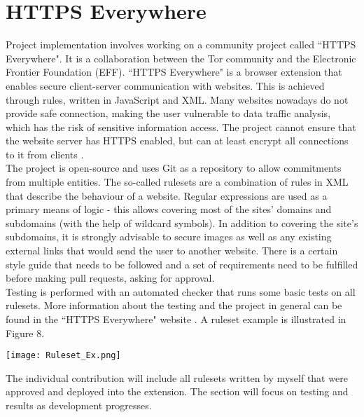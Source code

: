 \documentclass[a4paper, 12pt, titlepage]{article}
\begin{document}
\section{HTTPS Everywhere}
Project implementation involves working on a community project called ``HTTPS Everywhere". It is a collaboration between the Tor community and the Electronic Frontier Foundation (EFF). ``HTTPS Everywhere" is a browser extension that enables secure client-server communication with websites. This is achieved through rules, written in JavaScript and XML. Many websites nowadays do not provide safe connection, making the user vulnerable to data traffic analysis, which has the risk of sensitive information access. The project cannot ensure that the website server has HTTPS enabled, but can at least encrypt all connections to it from clients \cite{HTTPSEW}. \\[6pt]
The project is open-source and uses Git as a repository to allow commitments from multiple entities. The so-called rulesets are a combination of rules in XML that describe the behaviour of a website. Regular expressions are used as a primary means of logic - this allows covering most of the sites' domains and subdomains (with the help of wildcard symbols). In addition to covering the site's subdomains, it is strongly advisable to secure images as well as any existing external links that would send the user to another website. There is a certain style guide that needs to be followed and a set of requirements need to be fulfilled before making pull requests, asking for approval. \\[6pt]
Testing is performed with an automated checker that runs some basic tests on all rulesets. More information about the testing and the project in general can be found in the ``HTTPS Everywhere" website \cite{HTTPSDetails}. A ruleset example is illustrated in Figure 8.

\begin{center}
\texttt{[image: Ruleset\_Ex.png]}
\label{fig:Ruleset}
\end{center}
The individual contribution will include all rulesets written by myself that were approved and deployed into the extension. The section will focus on testing and results as development progresses.
\end{document}
